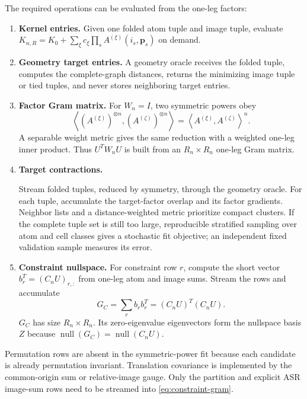 \documentclass{article}
\begin{document}
The required operations can be evaluated from the one-leg factors:
\begin{enumerate}
    \item \textbf{Kernel entries.} Given one folded atom tuple and image
    tuple, evaluate
    $K_{n,R}=K_0+\sum_\xi c_\xi\prod_s A^{(\xi)}(i_s,\bm p_s)$ on demand.
    \item \textbf{Geometry target entries.} A geometry oracle receives the
    folded tuple, computes the complete-graph distances, returns the
    minimizing image tuple or tied tuples, and never stores neighboring
    target entries.
    \item \textbf{Factor Gram matrix.} For $W_n=I$, two symmetric powers
    obey
    \begin{equation}
        \left\langle
        (A^{(\xi)})^{\otimes n},
        (A^{(\zeta)})^{\otimes n}
        \right\rangle
        =
        \left\langle A^{(\xi)},A^{(\zeta)}\right\rangle^n.
        \label{eq:symmetric-power-gram}
    \end{equation}
    A separable weight metric gives the same reduction with a weighted
    one-leg inner product. Thus $U^TW_nU$ is built from an
    $R_n\times R_n$ one-leg Gram matrix.
    \item \textbf{Target contractions.}\par
    Stream folded tuples, reduced by symmetry, through the geometry oracle. For each tuple, accumulate the
    target-factor overlap and its factor gradients. Neighbor lists and a
    distance-weighted metric
    prioritize compact clusters. If the complete tuple set is still too
    large, reproducible stratified sampling over atom and cell classes
    gives a stochastic fit objective; an independent fixed validation
    sample measures its error.
    \item \textbf{Constraint nullspace.} For constraint row $r$, compute
    the short vector
    $b_r^T=(C_nU)_{r,:}$ from one-leg atom and image sums. Stream the rows
    and accumulate
    \begin{equation}
        G_C
        =
        \sum_r b_rb_r^T
        =
        (C_nU)^T(C_nU).
        \label{eq:constraint-gram}
    \end{equation}
    $G_C$ has size $R_n\times R_n$. Its zero-eigenvalue eigenvectors form
    the nullspace basis $Z$ because
    $\operatorname{null}(G_C)=\operatorname{null}(C_nU)$.
\end{enumerate}

Permutation rows are absent in the symmetric-power fit because each
candidate is already permutation invariant. Translation covariance is
implemented by the common-origin sum or relative-image gauge. Only the
partition and explicit ASR image-sum rows need to be streamed into
\autoref{eq:constraint-gram}.
\end{document}
